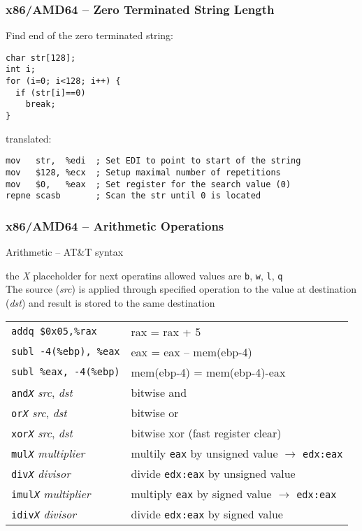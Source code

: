 \documentclass{beamer}
\begin{document}
\begin{frame}[fragile]
\frametitle{x86/AMD64 -- Zero Terminated String Length}

Find end of the zero terminated string:
\begin{verbatim}
char str[128];
int i;
for (i=0; i<128; i++) {
  if (str[i]==0) 
    break;
}
\end{verbatim}
translated:
\begin{verbatim}
mov   str,  %edi  ; Set EDI to point to start of the string
mov   $128, %ecx  ; Setup maximal number of repetitions
mov   $0,   %eax  ; Set register for the search value (0)
repne scasb       ; Scan the str until 0 is located
\end{verbatim}

\end{frame}



\begin{frame}
\frametitle{x86/AMD64 -- Arithmetic Operations}
Arithmetic -- AT\&T syntax

the \textit{X} placeholder for next operatins allowed values are \texttt{b}, \texttt{w}, \texttt{l}, \texttt{q}\\
The source (\textit{src}) is applied through specified operation to the value at destination (\textit{dst}) and result is stored to the same destination
\begin{tabular}{ l l}
\texttt{addq  \$0x05,\%rax} & rax = rax + 5\\
\texttt{subl  -4(\%ebp), \%eax} &  eax = eax -- mem(ebp-4)\\
\texttt{subl  \%eax, -4(\%ebp)} & mem(ebp-4) = mem(ebp-4)-eax\\
\texttt{and\textit{X}} \textit{src}, \textit{dst} & bitwise and\\
\texttt{or\textit{X}}  \textit{src}, \textit{dst} & bitwise or\\
\texttt{xor\textit{X}} \textit{src}, \textit{dst} & bitwise xor (fast register clear)\\
\texttt{mul\textit{X}} \textit{multiplier} & multily \texttt{eax} by unsigned value  $\rightarrow$  \texttt{edx:eax}\\
\texttt{div\textit{X}} \textit{divisor} & divide \texttt{edx:eax} by unsigned value\\
\texttt{imul\textit{X}} \textit{multiplier} & multiply \texttt{eax} by signed value  $\rightarrow$ \texttt{edx:eax}\\
\texttt{idiv\textit{X}} \textit{divisor} & divide \texttt{edx:eax} by signed value\\
\end{tabular}
\end{frame}
\end{document}

